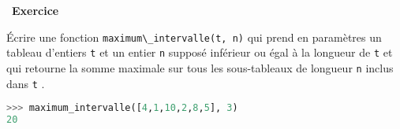 \documentclass[
  11pt,
]{article}
\newcommand{\passthrough}[1]{#1}
\newcounter{exo}
\newenvironment{exercice}[1]
{\par \medskip   \addtocounter{exo}{1} \noindent  
\begin{bclogo}[arrondi =0.1,   noborder = true, logo=\bccrayon, marge=4]{~\textbf{Exercice} \textbf{\theexo} {\itshape #1} }  \par}
{
\end{bclogo}
 \par \bigskip }
\begin{document}
\begin{exercice}{}

Écrire une fonction \passthrough{\lstinline!maximum\_intervalle(t, n)!}
qui prend en paramètres un tableau d'entiers \passthrough{\lstinline!t!}
et un entier \passthrough{\lstinline!n!} supposé inférieur ou égal à la
longueur de \passthrough{\lstinline!t!} et qui retourne la somme
maximale sur tous les sous-tableaux de longueur
\passthrough{\lstinline!n!} inclus dans \passthrough{\lstinline!t!} .

\begin{lstlisting}[language=Python]
>>> maximum_intervalle([4,1,10,2,8,5], 3)
20
\end{lstlisting}

\end{exercice}
\end{document}
